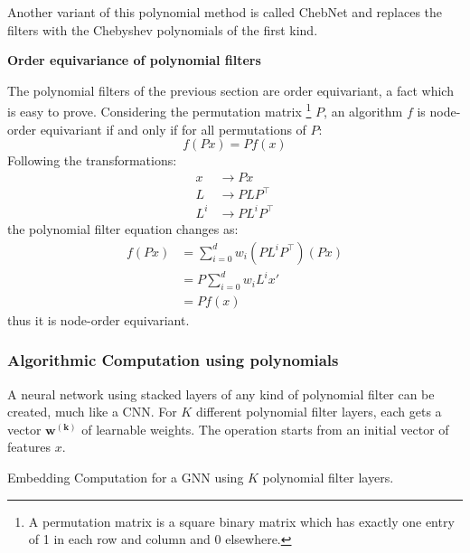 Another variant of this polynomial method is called ChebNet
\cite{defferrard2016convolutional} and replaces the filters with the
Chebyshev polynomials of the first kind.
\begin{remark}
  \textbf{Order equivariance of polynomial filters}

  The polynomial filters of the previous section are order equivariant, a fact
  which is easy to prove. Considering the permutation matrix \footnote{
    A permutation matrix is a square binary matrix which has exactly one
    entry of 1 in each row and column and 0 elsewhere. 
  } $P$, an algorithm $f$ is node-order equivariant if and only if for all
  permutations of $P$:
  \begin{equation*}
    f(Px) = Pf(x)
  \end{equation*}
  Following the transformations:
  \begin{equation*}
    \begin{split}
      x & \rightarrow Px\\
      L & \rightarrow PLP^\intercal\\
      L^i & \rightarrow PL^iP^\intercal
    \end{split}
  \end{equation*}
  the polynomial filter equation changes as:
  \begin{equation*}
    \begin{split}
      f(Px) & = \sum_{i=0}^dw_i (PL^iP^\intercal)(Px) \\
            & = P \sum_{i=0}^d w_iL^ix' \\
            & = Pf(x)
    \end{split}
  \end{equation*}
  thus it is node-order equivariant.
  \end{remark}


\subsubsection{Algorithmic Computation using polynomials}

A neural network using stacked layers of any kind of polynomial filter
can be created, much like a CNN. For $K$ different polynomial filter layers,
each gets a vector $\bm{w^{(k)}}$ of learnable weights. The operation starts
  from an initial vector of features $x$.
\begin{algorithm}
\caption{Embedding Computation for a GNN using $K$ polynomial filter layers.}
\label{alg:embedding_comp}
\DontPrintSemicolon
{}
\end{algorithm}

